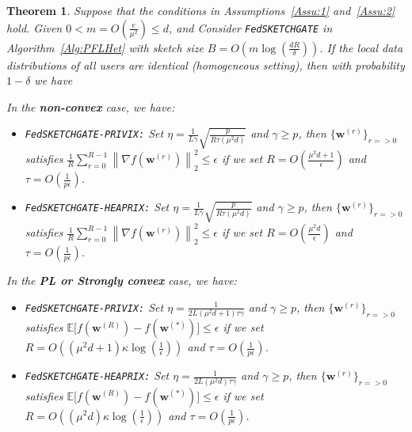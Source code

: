 \documentclass[twoside]{article}
\newtheorem{theorem}{Theorem}
\begin{document}
\begin{theorem}\label{thm:hetreg_case}
  Suppose that the conditions in Assumptions~\ref{Assu:1} and~\ref{Assu:2} hold. Given $0<m=O\left(\frac{e}{\mu^2}\right)\leq d$, and Consider \texttt{FedSKETCHGATE} in Algorithm~\ref{Alg:PFLHet} with sketch size $B=O\left(m\log\left(\frac{d R}{\delta}\right)\right)$. If the local data distributions of all users are identical (homogeneous setting), then with probability $1-\delta$ we have  

In the \textbf{non-convex} case, we have:  
     \begin{itemize}
         \item \texttt{FedSKETCHGATE-PRIVIX:} Set $\eta=\frac{1}{L\gamma}\sqrt{\frac{p}{R\tau\left(\mu^2d\right)}}$ and $\gamma\geq p$, then $\{ {\boldsymbol{w}}^{(r)}\}_{r=>0}$ satisfies  $\frac{1}{R}\sum_{r=0}^{R-1}\left\|\nabla f({\boldsymbol{w}}^{(r)})\right\|_2^2\leq {\epsilon}$ if we set
     $R=O\left(\frac{\mu^2d+1}{\epsilon}\right)$ and $ \tau=O\left(\frac{1}{{p}\epsilon}\right)$.
         \item \texttt{FedSKETCHGATE-HEAPRIX:} Set $\eta=\frac{1}{L\gamma}\sqrt{\frac{p}{R\tau\left(\mu^2d\right)}}$ and $\gamma\geq p$, then $\{ {\boldsymbol{w}}^{(r)}\}_{r=>0}$ satisfies  $\frac{1}{R}\sum_{r=0}^{R-1}\left\|\nabla f({\boldsymbol{w}}^{(r)})\right\|_2^2\leq {\epsilon}$ if we set
     $R=O\left(\frac{\mu^2d}{\epsilon}\right)$ and $ \tau=O\left(\frac{1}{{p}\epsilon}\right)$. 
     \end{itemize}
     
In the \textbf{PL or Strongly convex} case, we have:  
      \begin{itemize}
         \item \texttt{FedSKETCHGATE-PRIVIX:} Set $\eta=\frac{1}{2L\left({\mu^2d}+1\right)\tau\gamma}$ and $\gamma\geq p$, then $\{ {\boldsymbol{w}}^{(r)}\}_{r=>0}$ satisfies $\mathbb{E}\Big[f({\boldsymbol{w}}^{(R)})-f({\boldsymbol{w}}^{(*)})\Big]\leq \epsilon$ if  we set
     $R=O\left(\left(\mu^2d+1\right)\kappa\log\left(\frac{1}{\epsilon}\right)\right)$ and $ \tau=O\left(\frac{1}{p\epsilon}\right)$.
          
         \item \texttt{FedSKETCHGATE-HEAPRIX:} Set $\eta=\frac{1}{2L\left(\mu^2d\right)\tau\gamma}$ and $\gamma\geq p$, then $\{ {\boldsymbol{w}}^{(r)}\}_{r=>0}$ satisfies $\mathbb{E}\Big[f({\boldsymbol{w}}^{(R)})-f({\boldsymbol{w}}^{(*)})\Big]\leq \epsilon$ if  we set
     $R=O\left(\left(\mu^2d\right)\kappa\log\left(\frac{1}{\epsilon}\right)\right)$ and $ \tau=O\left(\frac{1}{p\epsilon}\right)$. 
      \end{itemize}
      

\end{theorem}
\end{document}
